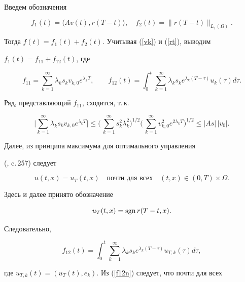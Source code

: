 \begin{pf} Введем обозначения


$$


f_1(t)=\langle Av(t),r(T-t)\rangle,


\quad f_2(t)=\|r(T-t) \|_{L_1(\Omega)}.


$$


Тогда $f(t)=f_1(t)+f_2(t)$. Учитывая (\ref{vk}) и (\ref{rt}), выводим 


$f_1(t)=f_{11}+f_{12}(t)$, где


$$


f_{11}= \sum_{k=1}^\infty \lambda_k s_kv_{k,0} e^{\lambda_k T},\qquad


f_{12}(t)=\int_0^t \sum_{k=1}^\infty


\lambda_k s_k e^{\lambda_k (T-\tau)} u_k(\tau)d\tau.


$$


Ряд, представляющий $f_{11}$, сходится, т.\,к.


$$


\bigg| \sum_{k=1}^\infty \lambda_k s_kv_{k,0} e^{\lambda_k T}\bigg|\le


\bigg(\, \sum_{k=1}^\infty  s_k^2\lambda_k^2\bigg)^{1/2}


\bigg(\,\sum_{k=1}^\infty  v_{k,0}^2e^{2\lambda_k T}\bigg)^{1/2}\le


|As|\,|v_0|.


$$


Далее, из принципа максимума для оптимального управления


(\cite{L}, c.\,257) следует


$$


u(t,x)=u_T(t,x)\quad\text{почти для всех}\quad (t,x)\in(0,T)\times\Omega.


$$


Здесь и далее принято обозначение 


$$u_T(t,x)= \sgn r(T-t,x).


$$


Следовательно, 


\begin{equation} \label{f12n}


f_{12}(t)=\int_0^t \sum_{k=1}^\infty


\lambda_k s_k e^{\lambda_k (T-\tau)} u_{T,k}(\tau)d\tau,


\end{equation}


где $u_{T,k}(t)=(u_T(t),e_k)$. Из (\ref{f12n}) следует, что почти для всех 



\end{pf}
